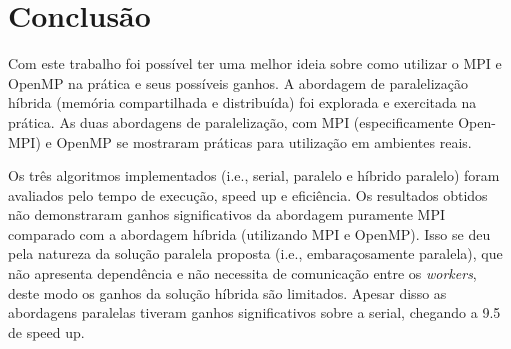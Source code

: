 \documentclass[12pt]{article}
\begin{document}
\section{Conclusão}
\label{sec:conclusao}

Com este trabalho foi possível ter uma melhor ideia sobre como utilizar o MPI e OpenMP na prática e seus possíveis ganhos. A abordagem de paralelização híbrida (memória compartilhada e distribuída) foi explorada e exercitada na prática. As duas abordagens de paralelização, com MPI (especificamente Open-MPI) e OpenMP se mostraram práticas para utilização em ambientes reais.

Os três algoritmos implementados (i.e., serial, paralelo e híbrido paralelo) foram avaliados pelo tempo de execução, speed up e eficiência. Os resultados obtidos não demonstraram ganhos significativos da abordagem puramente MPI comparado com a abordagem híbrida (utilizando MPI e OpenMP). Isso se deu pela natureza da solução paralela proposta (i.e., embaraçosamente paralela), que não apresenta dependência e não necessita de comunicação entre os \textit{workers}, deste modo os ganhos da solução híbrida são limitados. Apesar disso as abordagens paralelas tiveram ganhos significativos sobre a serial, chegando a 9.5 de speed up.



\end{document}
